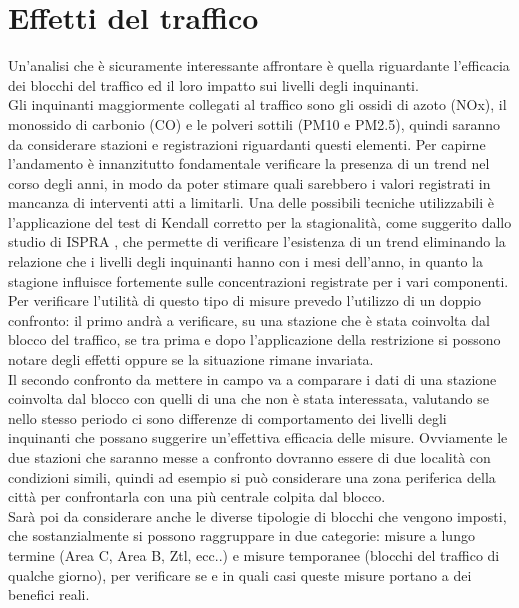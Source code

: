 \documentclass{article}
\begin{document}
\section{Effetti del traffico}
Un'analisi che è sicuramente interessante affrontare è quella riguardante l'efficacia dei blocchi del traffico ed il loro impatto sui livelli degli inquinanti. 
\\Gli inquinanti maggiormente collegati al traffico sono gli ossidi di azoto (NOx), il monossido di carbonio (CO) e le polveri sottili (PM10 e PM2.5), quindi saranno da considerare stazioni e registrazioni riguardanti questi elementi.
Per capirne l'andamento è innanzitutto fondamentale verificare la presenza di un trend nel corso degli anni, in modo da poter stimare quali sarebbero i valori registrati in mancanza di interventi atti a limitarli. Una delle possibili tecniche utilizzabili è l'applicazione del test di Kendall corretto per la stagionalità, come suggerito dallo studio di ISPRA \cite{cattani2014analisi}, che permette di verificare l'esistenza di un trend eliminando la relazione che i livelli degli inquinanti hanno con i mesi dell'anno, in quanto la stagione influisce fortemente sulle concentrazioni registrate per i vari componenti.   
\\Per verificare l'utilità di questo tipo di misure prevedo l'utilizzo di un doppio confronto: il primo andrà a verificare, su una stazione che è stata coinvolta dal blocco del traffico, se tra prima e dopo l'applicazione della restrizione si possono notare degli effetti oppure se la situazione rimane invariata.
\\Il secondo confronto da mettere in campo va a comparare i dati di una stazione coinvolta dal blocco con quelli di una che non è stata interessata, valutando se nello stesso periodo ci sono differenze di comportamento dei livelli degli inquinanti che possano suggerire un'effettiva efficacia delle misure. Ovviamente le due stazioni che saranno messe a confronto dovranno essere di due località con condizioni simili, quindi ad esempio si può considerare una zona periferica della città per confrontarla con una più centrale colpita dal blocco. 
\\Sarà poi da considerare anche le diverse tipologie di blocchi che vengono imposti, che sostanzialmente si possono raggruppare in due categorie: misure a lungo termine (Area C, Area B, Ztl, ecc..) e misure temporanee (blocchi del traffico di qualche giorno), per verificare se e in quali casi queste misure portano a dei benefici reali. 
\end{document}
